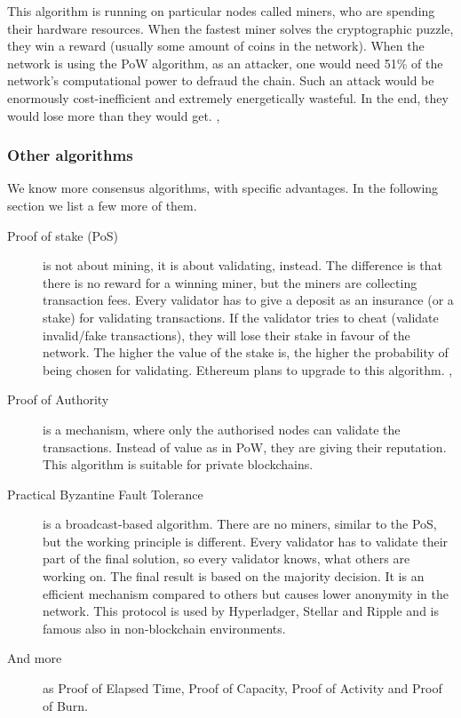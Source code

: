 \documentclass[thesis=M,english]{FITthesis}[2019/12/23]
\begin{document}
This algorithm is running on particular nodes called miners, who are spending their hardware resources. When the fastest miner solves the cryptographic puzzle, they win a reward (usually some amount of coins in the network).
When the network is using the PoW algorithm, as an attacker, one would need 51\% of the network's computational power to defraud the chain. Such an attack would be enormously cost-inefficient and extremely energetically wasteful. In the end, they would lose more than they would get. \cite{Singhal2018}, \cite{ethPow}

\subsubsection{Other algorithms}
We know more consensus algorithms, with specific advantages. In the following section we list a few more of them. 
\begin{description}

\item[Proof of stake (PoS)] is not about mining, it is about validating, instead. The difference is that there is no reward for a winning miner, but the miners are collecting transaction fees. Every validator has to give a deposit as an insurance (or a stake) for validating transactions. If the validator tries to cheat (validate invalid/fake transactions), they will lose their stake in favour of the network. The higher the value of the stake is, the higher the probability of being chosen for validating. Ethereum plans to upgrade to this algorithm. \cite{Singhal2018}, \cite{ethPow}

\item[Proof of Authority] is a mechanism, where only the authorised nodes can validate the transactions. Instead of value as in PoW, they are giving their reputation. This algorithm is suitable for private blockchains. \cite{mediumConsensus}

\item[Practical Byzantine Fault Tolerance] is a broadcast-based algorithm. There are no miners, similar to the PoS, but the working principle is different. Every validator has to validate their part of the final solution, so every validator knows, what others are working on. The final result is based on the majority decision. It is an efficient mechanism compared to others but causes lower anonymity in the network. This protocol is used by Hyperladger, Stellar and Ripple and is famous also in non-blockchain environments. \cite{Singhal2018}

\item[And more]
as Proof of Elapsed Time, Proof of Capacity, Proof of Activity and Proof of Burn.
\end{description}
\end{document}
